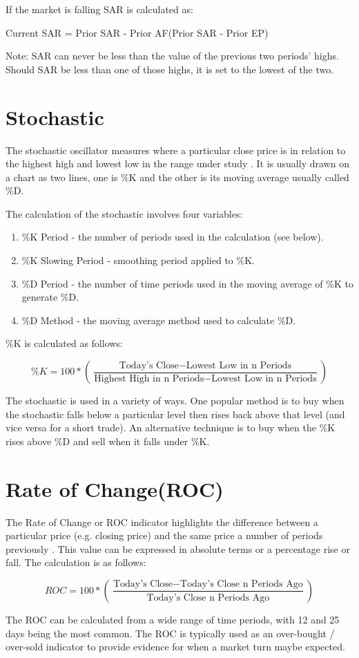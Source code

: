 If the market is falling SAR is calculated as:
\begin{center}
Current SAR = Prior SAR - Prior AF(Prior SAR - Prior EP)
\end{center}
Note:  SAR can never be less than the value of the previous two periods' highs. Should SAR be less than one of those highs, it is set to the lowest of the two.

\section{Stochastic}
\label{appB:stoch}
The stochastic oscillator measures where a particular close price is in relation to the highest high and lowest low in the range under study \citep{lane1986using}. It is usually drawn on a chart as two lines, one is \%K and the other is its moving average usually called \%D.

The calculation of the stochastic involves four variables:
\begin{enumerate}
\item \%K Period - the number of periods used in the calculation (see below).
\item \%K Slowing Period - smoothing period applied to \%K.
\item \%D Period - the number of time periods used in the moving average of \%K to generate \%D.
\item \%D Method - the moving average method used to calculate \%D.
\end{enumerate}

\%K is calculated as follows: 

\[ \%K = 100 * \left( \dfrac{\text{Today's Close} - \text{Lowest Low in n Periods}}{\text{Highest High in n Periods} - \text{Lowest Low in n Periods}} \right) \]

The stochastic is used in a variety of ways. One popular method is to buy when the stochastic falls below a particular level then rises back above that level (and vice versa for a short trade). An alternative technique is to buy when the \%K rises above \%D and sell when it falls under \%K.

\section{Rate of Change(ROC)}
\label{appB:roc}
The Rate of Change or ROC indicator highlights the difference between a particular price (e.g. closing price) and the same price a number of periods previously \citep{appel2005technical}. This value can be expressed in absolute terms or a percentage rise or fall. The calculation is as follows: 

\[ ROC = 100 * \left( \dfrac{ \text{Today's Close} - \text{Today's Close n Periods Ago}}{\text{Today's Close n Periods Ago}} \right) \]

The ROC can be calculated from a wide range of time periods, with 12 and 25 days being the most common. The ROC is typically used as an over-bought / over-sold indicator to provide evidence for when a market turn maybe expected.